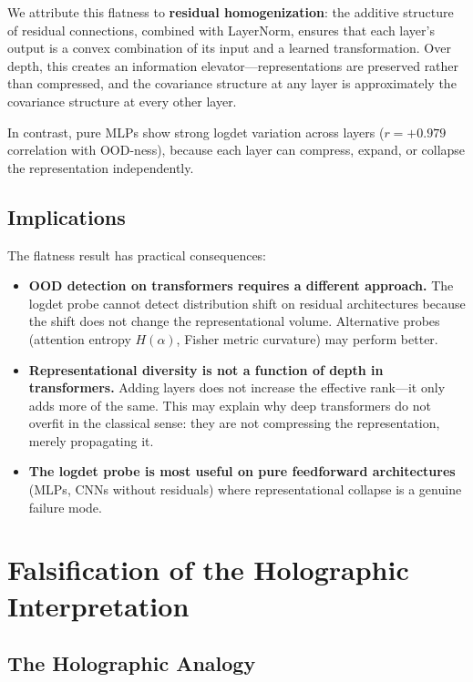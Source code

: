 \documentclass[12pt,a4paper]{article}
\begin{document}
We attribute this flatness to \textbf{residual homogenization}: the additive structure of residual connections, combined with LayerNorm, ensures that each layer's output is a convex combination of its input and a learned transformation. Over depth, this creates an information elevator---representations are preserved rather than compressed, and the covariance structure at any layer is approximately the covariance structure at every other layer.

In contrast, pure MLPs show strong logdet variation across layers ($r = +0.979$ correlation with OOD-ness), because each layer can compress, expand, or collapse the representation independently.

\subsection{Implications}

The flatness result has practical consequences:
\begin{itemize}
    \item \textbf{OOD detection on transformers requires a different approach.} The logdet probe cannot detect distribution shift on residual architectures because the shift does not change the representational volume. Alternative probes (attention entropy $H(\alpha)$, Fisher metric curvature) may perform better.
    \item \textbf{Representational diversity is not a function of depth in transformers.} Adding layers does not increase the effective rank---it only adds more of the same. This may explain why deep transformers do not overfit in the classical sense: they are not compressing the representation, merely propagating it.
    \item \textbf{The logdet probe is most useful on pure feedforward architectures} (MLPs, CNNs without residuals) where representational collapse is a genuine failure mode.
\end{itemize}

\section{Falsification of the Holographic Interpretation}
\label{sec:holographic}

\subsection{The Holographic Analogy}
\end{document}
